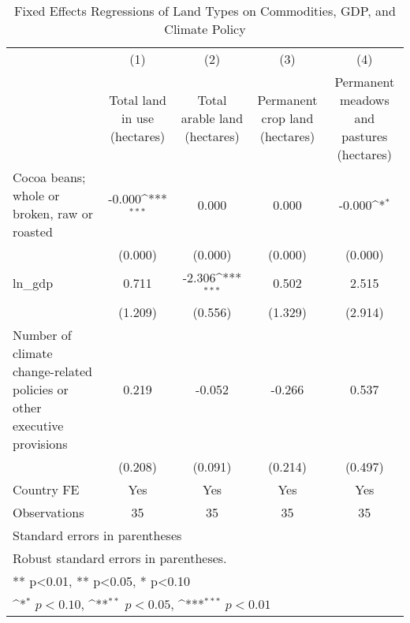 \begin{table}[htbp]\centering
\def\sym#1{\ifmmode^{#1}\else\(^{#1}\)\fi}
\caption{Fixed Effects Regressions of Land Types on Commodities, GDP, and Climate Policy}
\begin{tabular}{l*{4}{c}}
\toprule
                    &\multicolumn{1}{c}{(1)}&\multicolumn{1}{c}{(2)}&\multicolumn{1}{c}{(3)}&\multicolumn{1}{c}{(4)}\\
                    &\multicolumn{1}{c}{Total land in use (hectares)}&\multicolumn{1}{c}{Total arable land (hectares)}&\multicolumn{1}{c}{Permanent crop land (hectares)}&\multicolumn{1}{c}{Permanent meadows and pastures (hectares)}\\
\midrule
Cocoa beans; whole or broken, raw or roasted&      -0.000\sym{***}&       0.000         &       0.000         &      -0.000\sym{*}  \\
                    &     (0.000)         &     (0.000)         &     (0.000)         &     (0.000)         \\
\addlinespace
ln\_gdp              &       0.711         &      -2.306\sym{***}&       0.502         &       2.515         \\
                    &     (1.209)         &     (0.556)         &     (1.329)         &     (2.914)         \\
\addlinespace
Number of climate change-related policies or other executive provisions&       0.219         &      -0.052         &      -0.266         &       0.537         \\
                    &     (0.208)         &     (0.091)         &     (0.214)         &     (0.497)         \\
\addlinespace
Country FE          &         Yes         &         Yes         &         Yes         &         Yes         \\
\midrule
Observations        &          35         &          35         &          35         &          35         \\
\bottomrule
\multicolumn{5}{l}{\footnotesize Standard errors in parentheses}\\
\multicolumn{5}{l}{\footnotesize Robust standard errors in parentheses.}\\
\multicolumn{5}{l}{\footnotesize *** p<0.01, ** p<0.05, * p<0.10}\\
\multicolumn{5}{l}{\footnotesize \sym{*} \(p<0.10\), \sym{**} \(p<0.05\), \sym{***} \(p<0.01\)}\\
\end{tabular}
\end{table}
